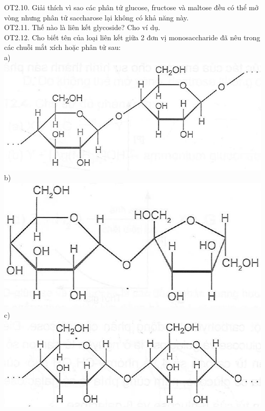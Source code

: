 \documentclass[10pt]{article}
\begin{document}
OT2.10. Giải thích vì sao các phân tử glucose, fructose và maltose đều có thể mở vòng nhưng phân tử saccharose lại không có khả năng này.\\
OT2.11. Thế nào là liên kết glycoside? Cho ví dụ.\\
OT2.12. Cho biết tên của loại liên kết giữa 2 đơn vị monosaccharide đã nêu trong các chuỗi mắt xích hoặc phân tử sau:\\
a)\\
\includegraphics[max width=\textwidth, center]{2025_10_23_de6f5713836e4e91b3c8g-038}\\
b)\\
\includegraphics[max width=\textwidth, center]{2025_10_23_de6f5713836e4e91b3c8g-038(1)}\\
c)\\
\includegraphics[max width=\textwidth, center]{2025_10_23_de6f5713836e4e91b3c8g-039}\\
\end{document}
